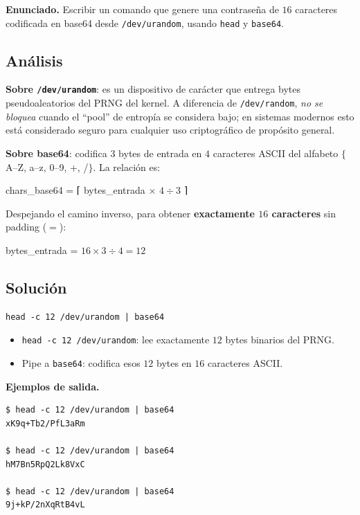 \documentclass[11pt,a4paper]{article}
\begin{document}
\textbf{Enunciado.} Escribir un comando que genere una contraseña de
$16$ caracteres codificada en base64 desde \texttt{/dev/urandom},
usando \texttt{head} y \texttt{base64}.

\subsection*{Análisis}

\textbf{Sobre \texttt{/dev/urandom}}: es un dispositivo de carácter
que entrega bytes pseudoaleatorios del PRNG del kernel. A diferencia
de \texttt{/dev/random}, \emph{no se bloquea} cuando el ``pool'' de
entropía se considera bajo; en sistemas modernos esto está
considerado seguro para cualquier uso criptográfico de propósito
general.

\textbf{Sobre base64}: codifica $3$ bytes de entrada en $4$
caracteres ASCII del alfabeto
$\{$A--Z, a--z, 0--9, +, /$\}$. La relación es:

\quad chars\_base64 = ⌈ bytes\_entrada × $4 \div 3$ ⌉

Despejando el camino inverso, para obtener \textbf{exactamente $16$
caracteres} sin padding ($=$):

\quad bytes\_entrada = $16 × 3 \div 4 = 12$

\subsection*{Solución}

\begin{lstlisting}[style=shellstyle]
head -c 12 /dev/urandom | base64
\end{lstlisting}

\begin{itemize}[leftmargin=*,nosep]
    \item \texttt{head -c 12 /dev/urandom}: lee exactamente $12$ bytes
        binarios del PRNG.
    \item Pipe a \texttt{base64}: codifica esos $12$ bytes en $16$
        caracteres ASCII.
\end{itemize}

\textbf{Ejemplos de salida.}

\begin{lstlisting}[style=textstyle]
$ head -c 12 /dev/urandom | base64
xK9q+Tb2/PfL3aRm

$ head -c 12 /dev/urandom | base64
hM7Bn5RpQ2Lk8VxC

$ head -c 12 /dev/urandom | base64
9j+kP/2nXqRtB4vL
\end{lstlisting}
\end{document}
